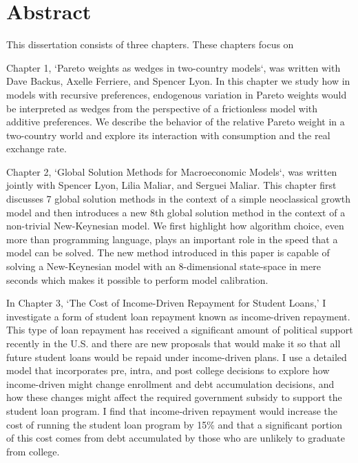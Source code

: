 \documentclass[12pt,letterpaper,oneside,final]{memoir}
\begin{document}
\newpage

\chapter{Abstract}

  \DoubleSpacing

  This dissertation consists of three chapters. These chapters focus on

  Chapter 1, `Pareto weights as wedges in two-country models`, was written with Dave Backus, Axelle
  Ferriere, and Spencer Lyon. In this chapter we study how in models with recursive preferences,
  endogenous variation in Pareto weights would be interpreted as wedges from the perspective of a
  frictionless model with additive preferences. We describe the behavior of the relative Pareto
  weight in a two-country world and explore its interaction with consumption and the real exchange
  rate.

  Chapter 2, `Global Solution Methods for Macroeconomic Models`, was written jointly with Spencer
  Lyon, Lilia Maliar, and Serguei Maliar. This chapter first discusses 7 global solution methods in
  the context of a simple neoclassical growth model and then introduces a new 8th global solution
  method in the context of a non-trivial New-Keynesian model. We first highlight how algorithm
  choice, even more than programming language, plays an important role in the speed that a model can
  be solved. The new method introduced in this paper is capable of solving a New-Keynesian model
  with an 8-dimensional state-space in mere seconds which makes it possible to perform model
  calibration.

  In Chapter 3, `The Cost of Income-Driven Repayment for Student Loans,' I investigate a form of
  student loan repayment known as income-driven repayment. This type of loan repayment has received
  a significant amount of political support recently in the U.S. and there are new proposals that
  would make it so that all future student loans would be repaid under income-driven plans. I use a
  detailed model that incorporates pre, intra, and post college decisions to explore how
  income-driven might change enrollment and debt accumulation decisions, and how these changes might
  affect the required government subsidy to support the student loan program. I find that
  income-driven repayment would increase the cost of running the student loan program by 15\% and
  that a significant portion of this cost comes from debt accumulated by those who are unlikely to
  graduate from college.
\end{document}

